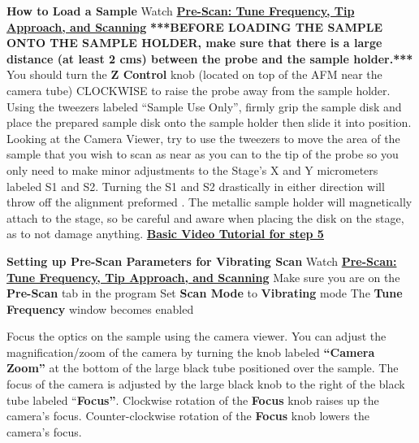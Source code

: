 \documentclass{../lab}
\begin{document}
\textbf{How to Load a Sample }
Watch\textbf{ }\href{http://experimentationlab.berkeley.edu/sites/default/files/prescan\_final\_0.mp4}{\textbf{Pre-Scan: Tune Frequency, Tip Approach, and Scanning}}
\textbf{***BEFORE LOADING THE SAMPLE ONTO THE SAMPLE HOLDER, make sure that there is a large distance (at least 2 cms) between the probe and the sample holder.***}  You should turn the \textbf{Z Control }knob (located on top of the AFM near the camera tube) CLOCKWISE to raise the probe away from the sample holder.
Using the tweezers labeled ``Sample Use Only'', firmly grip the sample disk and place the prepared sample disk onto the sample holder then slide it into position.  Looking at the Camera Viewer, try to use the tweezers to move the area of the sample that you wish to scan as near as you can to the tip of the probe so you only need to make minor adjustments to the Stage's X and Y micrometers labeled S1 and S2.  Turning the S1 and S2 drastically in either direction will throw off the alignment preformed\textbf{ }.
The metallic sample holder will magnetically attach to the stage, so be careful and aware when placing the disk on the stage, as to not damage anything.
\href{http://experimentationlab.berkeley.edu/sites/default/files/AFMImages/3.0\%20Sample\%20Exchange\%28V1.0\%29.wmv}{\textbf{Basic Video Tutorial for step 5}}
\textbf{}



\textbf{Setting up Pre-Scan Parameters for Vibrating Scan}
Watch \href{http://experimentationlab.berkeley.edu/sites/default/files/prescan\_final2.mp4}{\textbf{Pre-Scan: Tune Frequency, Tip Approach, and Scanning}}
Make sure you are on the \textbf{Pre-Scan }tab in the program
Set \textbf{Scan Mode} to \textbf{Vibrating }mode
The \textbf{Tune Frequency} window becomes enabled

Focus the optics on the sample using the camera viewer.  You can adjust the magnification/zoom of the camera by turning the knob labeled\textbf{ ``Camera Zoom''} at the bottom of the large black tube positioned over the sample.  The focus of the camera is adjusted by the large black knob to the right of the black tube labeled ``\textbf{Focus''}.
Clockwise rotation of the \textbf{Focus }knob raises up the camera's focus.
Counter-clockwise rotation of the \textbf{Focus }knob lowers the camera's focus.
\end{document}
